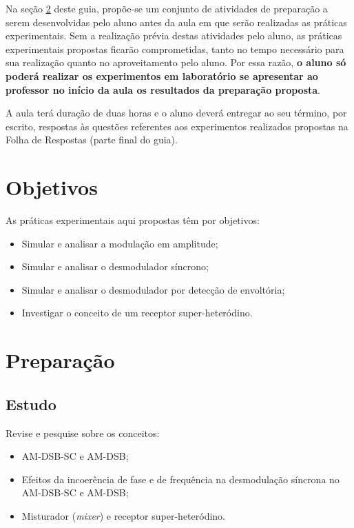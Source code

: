 \documentclass[12pt,addpoints]{exam}
\begin{document}
Na seção \ref{sect:Preparacao} deste guia, propõe-se um conjunto de atividades de preparação a serem desenvolvidas pelo aluno antes da aula em que serão realizadas as práticas experimentais. Sem a realização prévia destas atividades pelo aluno, as práticas experimentais propostas ficarão comprometidas, tanto no tempo necessário para sua realização quanto no aproveitamento pelo aluno. Por essa razão, \textbf{o aluno só poderá realizar os experimentos em laboratório se apresentar ao professor no início da aula os resultados da preparação proposta}. 

A aula terá duração de duas horas e o aluno deverá entregar ao seu término, por escrito, respostas às questões referentes aos experimentos realizados propostas na Folha de Respostas (parte final do guia).

\section{Objetivos}

As práticas experimentais aqui propostas têm por objetivos:
\begin{itemize}
    \item Simular e analisar a modulação em amplitude;
    \item Simular e analisar o desmodulador síncrono;
    \item Simular e analisar o desmodulador por detecção de envoltória;
    \item Investigar o conceito de um receptor super-heteródino.
\end{itemize}

\section{Preparação} \label{sect:Preparacao}

\subsection{Estudo}

Revise e pesquise sobre os conceitos:
\begin{itemize}
    \item AM-DSB-SC e AM-DSB;
    \item Efeitos da incoerência de fase e de frequência na desmodulação síncrona no AM-DSB-SC e AM-DSB;
    \item Misturador (\textit{mixer}) e receptor super-heteródino.
\end{itemize}
\end{document}
